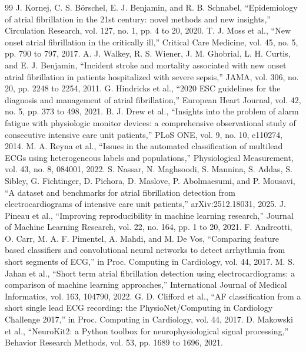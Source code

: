 \documentclass[conference,a4paper]{IEEEtran}
\begin{document}
\begin{thebibliography}{99}
 J. Kornej, C. S. Börschel, E. J. Benjamin, and R. B. Schnabel, ``Epidemiology of atrial fibrillation in the 21st century: novel methods and new insights,'' Circulation Research, vol. 127, no. 1, pp. 4 to 20, 2020.
 T. J. Moss et al., ``New onset atrial fibrillation in the critically ill,'' Critical Care Medicine, vol. 45, no. 5, pp. 790 to 797, 2017.
 A. J. Walkey, R. S. Wiener, J. M. Ghobrial, L. H. Curtis, and E. J. Benjamin, ``Incident stroke and mortality associated with new onset atrial fibrillation in patients hospitalized with severe sepsis,'' JAMA, vol. 306, no. 20, pp. 2248 to 2254, 2011.
 G. Hindricks et al., ``2020 ESC guidelines for the diagnosis and management of atrial fibrillation,'' European Heart Journal, vol. 42, no. 5, pp. 373 to 498, 2021.
 B. J. Drew et al., ``Insights into the problem of alarm fatigue with physiologic monitor devices: a comprehensive observational study of consecutive intensive care unit patients,'' PLoS ONE, vol. 9, no. 10, e110274, 2014.
 M. A. Reyna et al., ``Issues in the automated classification of multilead ECGs using heterogeneous labels and populations,'' Physiological Measurement, vol. 43, no. 8, 084001, 2022.
 S. Nassar, N. Maghsoodi, S. Mannina, S. Addas, S. Sibley, G. Fichtinger, D. Pichora, D. Maslove, P. Abolmaesumi, and P. Mousavi, ``A dataset and benchmarks for atrial fibrillation detection from electrocardiograms of intensive care unit patients,'' arXiv:2512.18031, 2025.
 J. Pineau et al., ``Improving reproducibility in machine learning research,'' Journal of Machine Learning Research, vol. 22, no. 164, pp. 1 to 20, 2021.
 F. Andreotti, O. Carr, M. A. F. Pimentel, A. Mahdi, and M. De Vos, ``Comparing feature based classifiers and convolutional neural networks to detect arrhythmia from short segments of ECG,'' in Proc. Computing in Cardiology, vol. 44, 2017.
 M. S. Jahan et al., ``Short term atrial fibrillation detection using electrocardiograms: a comparison of machine learning approaches,'' International Journal of Medical Informatics, vol. 163, 104790, 2022.
 G. D. Clifford et al., ``AF classification from a short single lead ECG recording: the PhysioNet/Computing in Cardiology Challenge 2017,'' in Proc. Computing in Cardiology, vol. 44, 2017.
 D. Makowski et al., ``NeuroKit2: a Python toolbox for neurophysiological signal processing,'' Behavior Research Methods, vol. 53, pp. 1689 to 1696, 2021.

\end{thebibliography}
\end{document}
